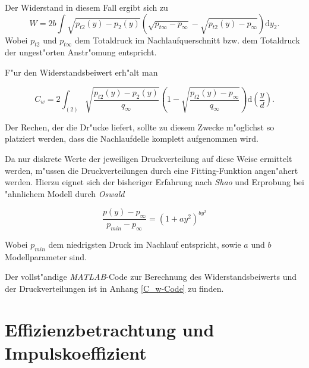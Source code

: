 Der Widerstand in diesem Fall ergibt sich zu
\begin{equation}
	\label{eq:widerstand_korrigiert}
	W = 2b \int \sqrt{p_{t2}(y) - p_2(y)} \left(\sqrt{p_{t\infty} - p_{\infty}} - \sqrt{p_{t2}(y) - p_{\infty}}\right) \mathrm{d} y_2 .
\end{equation}
Wobei $p_{t2}$ und $p_{t\infty}$ dem Totaldruck im Nachlaufquerschnitt bzw. dem Totaldruck der ungest"orten Anstr"omung entspricht.

F"ur den Widerstandsbeiwert erh"alt man

\begin{equation}
	\label{eq:C_w_korrigiert}
	C_w = 2 \int_{(2)} \sqrt{\frac{p_{t2}(y) - p_2(y)}{q_{\infty}}}
	\left(1 - \sqrt{\frac{p_{t2}(y) - p_{\infty}}{q_{\infty}}}\right)  \mathrm{d}\left(\frac{y}{d}\right).
\end{equation}

Der Rechen, der die Dr"ucke liefert, sollte zu diesem Zwecke m"oglichst so platziert werden, dass die Nachlaufdelle komplett aufgenommen wird. 

Da nur diskrete Werte der jeweiligen Druckverteilung auf diese Weise ermittelt  werden, m"ussen die Druckverteilungen durch eine Fitting-Funktion angen"ahert werden. 
Hierzu eignet sich der bisheriger Erfahrung nach \textit{Shao} und Erprobung bei "ahnlichem Modell durch \textit{Oswald}

	\begin{equation}
	\label{eq:fitting-function}
	\frac{p(y) - p_{\infty}}{p_{min}-p_{\infty}} = (1 +ay^2)^{by^2}
	\end{equation}

Wobei $p_{min}$ dem niedrigsten Druck im Nachlauf entspricht, sowie $a$ und $b$ Modellparameter sind.\cite{Oswald.2017}

Der vollst"andige \textit{MATLAB}-Code zur Berechnung des Widerstandsbeiwerts und der Druckverteilungen ist in Anhang \ref{C_w-Code} zu finden. 

\section{Effizienzbetrachtung und Impulskoeffizient}

